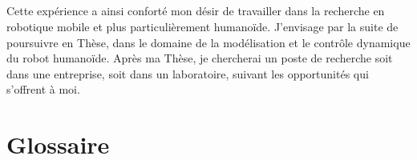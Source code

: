 \documentclass{report}
\begin{document}
\section*{} %


Cette expérience a ainsi conforté mon désir de travailler dans la recherche en robotique mobile et plus particulièrement humanoïde. J'envisage par la suite de poursuivre en Thèse, dans le domaine de la modélisation et le contrôle dynamique du robot humanoïde. Après ma Thèse, je chercherai un poste de recherche soit dans une entreprise, soit dans un laboratoire, suivant les opportunités qui s'offrent à moi.





\chapter*{Glossaire}
\end{document}
